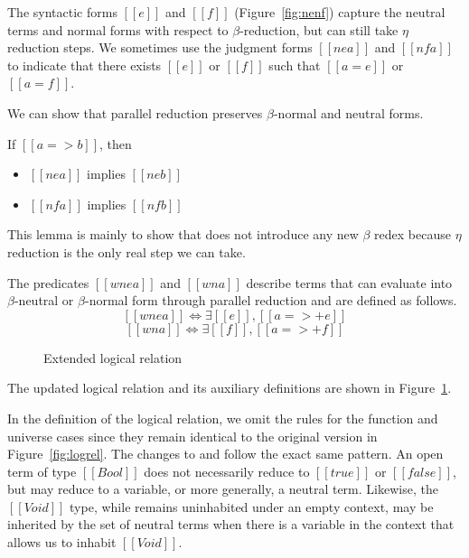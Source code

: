 \documentclass[acmsmall,screen=true,
\ifpublic review=false\else,review=true\fi
  ,anonymous=\ifanonymous true\else false\fi]{acmart}
\newcommand{\scw}[1]{}
\begin{document}
The syntactic forms $[[e]]$ and $[[f]]$ (Figure~\ref{fig:nenf}) capture the neutral terms
and normal forms with respect to $\beta$-reduction, but can still take
$\eta$ reduction steps. We sometimes use the judgment forms $[[ne a]]$
and $[[nf a]]$ to indicate that there exists $[[e]]$ or $[[f]]$ such
that $[[a = e]]$ or $[[a = f]]$.

We can show that parallel reduction preserves $\beta$-normal and
neutral forms.
\begin{lemma}
  \label{lemma:parnenf}
  If $[[a => b]]$, then
  \begin{itemize}
  \item $[[ne a]]$ implies $[[ne b]]$
  \item $[[nf a]]$ implies $[[nf b]]$
  \end{itemize}
\end{lemma}
This lemma is mainly to show that  does not introduce
any new $\beta$ redex because $\eta$ reduction is the only real step
we can take.

The predicates $[[wne a]]$ and $[[wn
a]]$ describe terms that can evaluate into $\beta$-neutral or
$\beta$-normal form through parallel reduction and are defined as
follows.\scw{What does $wne$ stand for?}
\[ [[wne a]] \iff \exists [[e]], [[a =>+ e]] \]
\[ [[wn a]] \iff \exists [[f]], [[a =>+ f]] \]

\begin{figure}[h]
  \caption{Extended logical relation}
  \label{fig:logrelopen}
\end{figure}

The updated logical relation and its auxiliary definitions are shown
in Figure~\ref{fig:logrelopen}.


In the definition of the logical relation, we omit the rules for
the function and universe cases since they remain identical to the
original version in Figure~\ref{fig:logrel}.
The changes to  and  follow the exact same pattern.
An open term of type $[[Bool]]$ does
not necessarily reduce to $[[true]]$ or $[[false]]$, but may reduce to
a variable, or more generally, a neutral term. Likewise, the
$[[Void]]$ type, while remains uninhabited under an empty context, may
be inherited by the set of neutral terms when there is a variable in
the context that allows us to inhabit $[[Void]]$.
\end{document}
